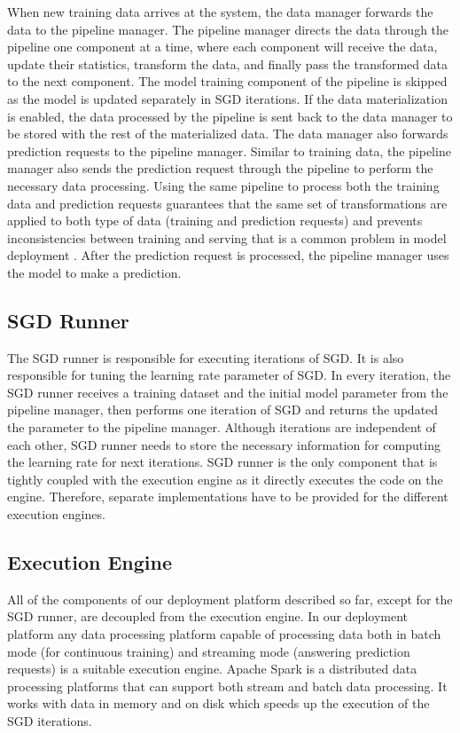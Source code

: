 When new training data arrives at the system, the data manager forwards the data to the pipeline manager. 
The pipeline manager directs the data through the pipeline one component at a time, where each component will receive the data, update their statistics, transform the data, and finally pass the transformed data to the next component.
The model training component of the pipeline is skipped as the model is updated separately in SGD iterations.
If the data materialization is enabled, the data processed by the pipeline is sent back to the data manager to be stored with the rest of the materialized data.
The data manager also forwards prediction requests to the pipeline manager.
Similar to training data, the pipeline manager also sends the prediction request through the pipeline to perform the necessary data processing.
Using the same pipeline to process both the training data and prediction requests guarantees that the same set of transformations are applied to both type of data (training and prediction requests) and prevents inconsistencies between training and serving that is a common problem in model deployment \cite{baylor2017tfx}.
After the prediction request is processed, the pipeline manager uses the model to make a prediction.

\subsection{SGD Runner} 
The SGD runner is responsible for executing iterations of SGD.
It is also responsible for tuning the learning rate parameter of SGD.
In every iteration, the SGD runner receives a training dataset and the initial model parameter from the pipeline manager, then performs one iteration of SGD and returns the updated the parameter to the pipeline manager.
Although iterations are independent of each other, SGD runner needs to store the necessary information for computing the learning rate for next iterations.
SGD runner is the only component that is tightly coupled with the execution engine as it directly executes the code on the engine.
Therefore, separate implementations have to be provided for the different execution engines.


\subsection{Execution Engine}
All of the components of our deployment platform described so far, except for the SGD runner, are decoupled from the execution engine.
In our deployment platform any data processing platform capable of processing data both in batch mode (for continuous training) and streaming mode (answering prediction requests) is a suitable execution engine.
Apache Spark \cite{zaharia2010spark} is a distributed data processing platforms that can support both stream and batch data processing.
It works with data in memory and on disk which speeds up the execution of the SGD iterations.

